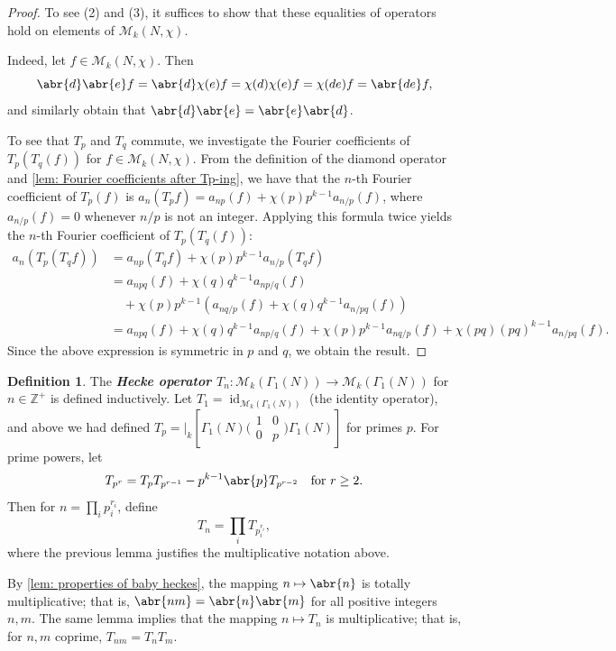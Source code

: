 \documentclass[10pt,leqno,twoside]{article}
\theoremstyle{plain}
\theoremstyle{definition}
\newtheorem{definition/}[lem]{Definition}
\newenvironment{definition}
  {\renewcommand{\qedsymbol}{\textdagger}%
   \pushQED{\qed}\begin{definition/}}
  {\popQED\end{definition/}}
\numberwithin{equation}{section}
\numberwithin{lem}{section}
\newcommand{\textib}[1]{\textbf{\textit{#1\index{#1}}}} %
\DeclareMathOperator{\id}{id}
\begin{document}
\begin{proof}
    To see (2) and (3), it suffices to show that these equalities of operators hold on elements of $\mathcal M_k(N,\chi)$.

    Indeed, let $f\in\mathcal M_k(N,\chi)$. Then \[\abr{d}\abr{e}f = \abr{d}\chi(e)f = \chi(d)\chi(e)f = \chi(de)f = \abr{de}f,\] and similarly obtain that $\abr{d}\abr{e} = \abr{e}\abr{d}$.
    
    To see that $T_p$ and $T_q$ commute, we investigate the Fourier coefficients of $T_p(T_q(f))$ for $f\in\mathcal M_k(N,\chi)$. From the definition of the diamond operator and \cref{lem: Fourier coefficients after Tp-ing}, we have that the $n$-th Fourier coefficient of $T_p(f)$ is $a_n(T_pf) = a_{np}(f)+ \chi(p)p^{k-1}a_{n/p}(f)$, where $a_{n/p}(f) = 0$ whenever $n/p$ is not an integer. Applying this formula twice yields the $n$-th Fourier coefficient of $T_p(T_q(f))$:
    \begin{align*}
        a_n(T_p(T_qf)) &= a_{np}(T_qf)+ \chi(p)p^{k-1}a_{n/p}(T_qf)\\
        &= a_{npq}(f) + \chi(q)q^{k-1}a_{np/q}(f)\\
        &\hspace{1em}+ \chi(p)p^{k-1}(a_{nq/p}(f) + \chi(q)q^{k-1}a_{n/pq}(f))\\
        &= a_{npq}(f) + \chi(q)q^{k-1}a_{np/q}(f) + \chi(p)p^{k-1}a_{nq/p}(f) + \chi(pq)(pq)^{k-1}a_{n/pq}(f). 
    \end{align*}
    Since the above expression is symmetric in $p$ and $q$, we obtain the result.
\end{proof}
\begin{definition}
    The \textib{Hecke operator $T_n$}$\colon \mathcal M_k(\varGamma_1(N))\to \mathcal M_k(\varGamma_1(N))$ for $n\in\mathbb Z^+$ is defined inductively. Let $T_1 = \id_{\mathcal M_k(\varGamma_1(N))}$ (the identity operator), and above we had defined $T_p = |_k[\varGamma_1(N)\big(\!\begin{smallmatrix}
        1 & 0 \\ 0 & p
    \end{smallmatrix}\!\big)\varGamma_1(N)]$ for primes $p$. For prime powers, let
    \[T_{p^r} = T_pT_{p^{r-1}} - p^{k-1}\abr{p}T_{p^{r-2}}\quad \text{for $r\geq 2$}.\] Then for $n = \prod_i p_i^{r_i}$, define 
    \[T_n = \prod_i T_{p_i^{r_i}},\] where the previous lemma justifies the multiplicative notation above.
\end{definition}

By \cref{lem: properties of baby heckes}, the mapping $n\mapsto \abr{n}$ is totally multiplicative; that is, $\abr{nm} = \abr{n}\abr{m}$ for all positive integers $n,m$. The same lemma implies that the mapping $n\mapsto T_n$ is multiplicative; that is, for $n,m$ coprime, $T_{nm} = T_nT_m$.
\end{document}
